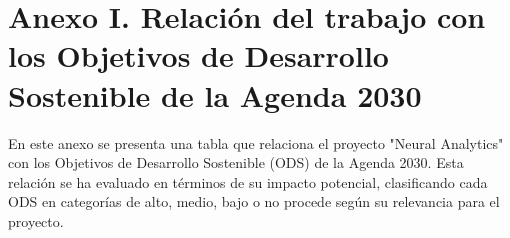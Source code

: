 \chapter*{Anexo I. Relación del trabajo con los Objetivos de Desarrollo Sostenible de la Agenda 2030}

En este anexo se presenta una tabla que relaciona el proyecto "Neural Analytics" con los Objetivos de Desarrollo Sostenible (ODS) de la Agenda 2030. Esta relación se ha evaluado en términos de su impacto potencial, clasificando cada ODS en categorías de alto, medio, bajo o no procede según su relevancia para el proyecto.

